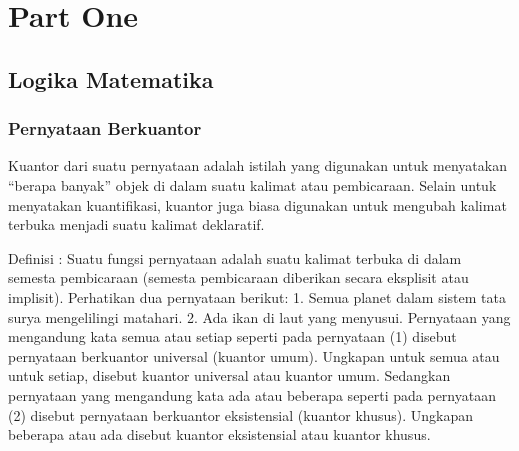 \documentclass[11pt,fleqn]{book} %
\begin{document}


\pagestyle{empty} %

\tableofcontents %

\cleardoublepage %

\pagestyle{fancy} %


\part{Part One}



\chapter{Logika Matematika}

\section{Pernyataan Berkuantor}

Kuantor dari suatu pernyataan adalah istilah yang digunakan untuk menyatakan “berapa banyak” objek di dalam suatu kalimat atau pembicaraan. Selain untuk menyatakan kuantifikasi, kuantor juga biasa digunakan untuk mengubah kalimat terbuka menjadi suatu kalimat deklaratif.

Definisi : Suatu fungsi pernyataan adalah suatu kalimat terbuka di dalam semesta pembicaraan (semesta pembicaraan diberikan secara eksplisit atau implisit).
Perhatikan dua pernyataan berikut:
1.    Semua planet dalam sistem tata surya mengelilingi matahari.
2.    Ada ikan di laut yang menyusui.
Pernyataan yang mengandung kata semua atau setiap seperti pada pernyataan (1) disebut pernyataan berkuantor universal (kuantor umum). Ungkapan untuk semua atau untuk setiap, disebut kuantor universal atau kuantor umum. Sedangkan pernyataan yang mengandung kata ada atau beberapa seperti pada pernyataan (2) disebut pernyataan berkuantor eksistensial (kuantor khusus). Ungkapan beberapa atau ada disebut kuantor eksistensial atau kuantor khusus.
\end{document}
